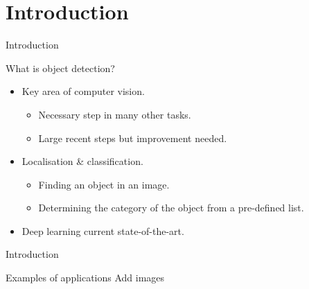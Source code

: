 \section{Introduction}
\begin{frame}{Introduction}{}
    \begin{block}{}
        What is object detection?
        \begin{itemize}
            \item Key area of computer vision.
                \begin{itemize}
                    \item Necessary step in many other tasks.
                    \item Large recent steps but improvement needed.
                \end{itemize}
        \end{itemize}
        \begin{itemize}
            \item Localisation \& classification.
                \begin{itemize}
                    \item Finding an object in an image.
                    \item Determining the category of the object from a pre-defined list.
                \end{itemize}
        \end{itemize}
        \begin{itemize}
            \item Deep learning current state-of-the-art.
        \end{itemize}
    \end{block}
\end{frame}

\begin{frame}{Introduction}{}
    \begin{block}{}
        Examples of applications
        Add images
    \end{block}
\end{frame}




